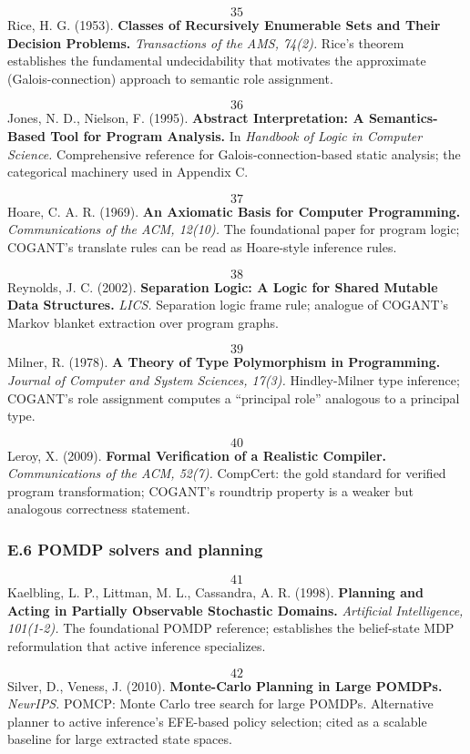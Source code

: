 \documentclass[
]{article}
\begin{document}
\[35\] Rice, H. G. (1953). \textbf{Classes of Recursively Enumerable
Sets and Their Decision Problems.} \emph{Transactions of the AMS,
74(2).} Rice's theorem establishes the fundamental undecidability that
motivates the approximate (Galois-connection) approach to semantic role
assignment.

\[36\] Jones, N. D., Nielson, F. (1995). \textbf{Abstract
Interpretation: A Semantics-Based Tool for Program Analysis.} In
\emph{Handbook of Logic in Computer Science.} Comprehensive reference
for Galois-connection-based static analysis; the categorical machinery
used in Appendix C.

\[37\] Hoare, C. A. R. (1969). \textbf{An Axiomatic Basis for Computer
Programming.} \emph{Communications of the ACM, 12(10).} The foundational
paper for program logic; COGANT's translate rules can be read as
Hoare-style inference rules.

\[38\] Reynolds, J. C. (2002). \textbf{Separation Logic: A Logic for
Shared Mutable Data Structures.} \emph{LICS.} Separation logic frame
rule; analogue of COGANT's Markov blanket extraction over program
graphs.

\[39\] Milner, R. (1978). \textbf{A Theory of Type Polymorphism in
Programming.} \emph{Journal of Computer and System Sciences, 17(3).}
Hindley-Milner type inference; COGANT's role assignment computes a
``principal role'' analogous to a principal type.

\[40\] Leroy, X. (2009). \textbf{Formal Verification of a Realistic
Compiler.} \emph{Communications of the ACM, 52(7).} CompCert: the gold
standard for verified program transformation; COGANT's roundtrip
property is a weaker but analogous correctness statement.

\subsubsection{E.6 POMDP solvers and
planning}\label{e.6-pomdp-solvers-and-planning}

\[41\] Kaelbling, L. P., Littman, M. L., Cassandra, A. R. (1998).
\textbf{Planning and Acting in Partially Observable Stochastic Domains.}
\emph{Artificial Intelligence, 101(1-2).} The foundational POMDP
reference; establishes the belief-state MDP reformulation that active
inference specializes.

\[42\] Silver, D., Veness, J. (2010). \textbf{Monte-Carlo Planning in
Large POMDPs.} \emph{NeurIPS.} POMCP: Monte Carlo tree search for large
POMDPs. Alternative planner to active inference's EFE-based policy
selection; cited as a scalable baseline for large extracted state
spaces.
\end{document}
